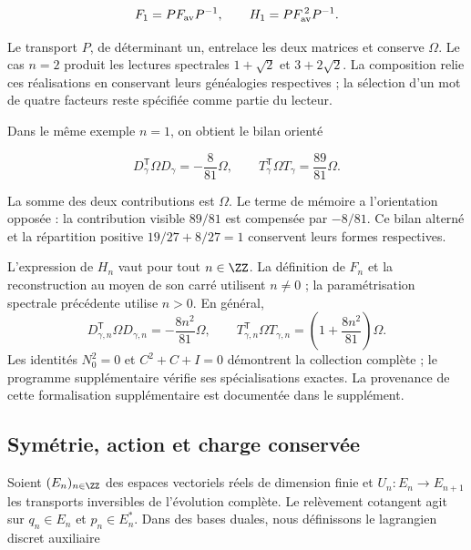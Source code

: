 \begin{equation}
F_1=PF_{\rm av}P^{-1},\qquad
H_1=PF_{\rm av}^{\,2}P^{-1}.
\label{nuc11:eq:32}
\end{equation}



Le transport \(P\), de déterminant un, entrelace les deux
matrices et conserve \(\Omega\).
Le cas \(n=2\) produit les lectures spectrales
\(1+\sqrt2\) et \(3+2\sqrt2\).
La composition relie ces réalisations en conservant leurs
généalogies respectives ; la sélection d’un mot de quatre
facteurs reste spécifiée comme partie du lecteur.


Dans le même exemple \(n=1\), on obtient le bilan orienté



\begin{equation}
D_\gamma^{\mathsf T}\Omega D_\gamma=-\frac8{81}\Omega,
\qquad
T_\gamma^{\mathsf T}\Omega T_\gamma=\frac{89}{81}\Omega.
\label{nuc11:eq:33}
\end{equation}



La somme des deux contributions est \(\Omega\).
Le terme de mémoire a l’orientation opposée :
la contribution visible \(89/81\) est compensée par \(-8/81\).
Ce bilan alterné et la répartition positive
\(19/27+8/27=1\) conservent leurs formes respectives.

L’expression de \(H_n\) vaut pour tout \(n\in\ZZ\).
La définition de \(F_n\) et la reconstruction au moyen de son carré
utilisent \(n\ne0\) ; la paramétrisation spectrale précédente utilise
\(n>0\).
En général,
\[
 D_{\gamma,n}^{\mathsf T}\Omega D_{\gamma,n}
 =-\frac{8n^2}{81}\Omega,\qquad
 T_{\gamma,n}^{\mathsf T}\Omega T_{\gamma,n}
 =\left(1+\frac{8n^2}{81}\right)\Omega.
\]
Les identités \(N_0^2=0\) et \(C^2+C+I=0\) démontrent la
collection complète ; le programme supplémentaire vérifie ses
spécialisations exactes.
La provenance de cette formalisation supplémentaire est documentée
dans le supplément.

\subsection{Symétrie, action et charge conservée}

Soient \((E_n)_{n\in\ZZ}\) des espaces vectoriels réels de dimension
finie et \(U_n:E_n\to E_{n+1}\) les transports inversibles de
l’évolution complète.
Le relèvement cotangent agit sur
\(q_n\in E_n\) et \(p_n\in E_n^*\).
Dans des bases duales, nous définissons le lagrangien discret auxiliaire

